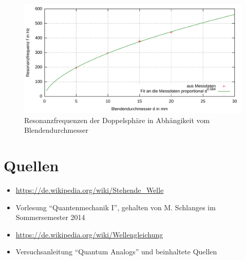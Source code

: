 \documentclass[numbers=noenddot,12pt,a4paper]{scrartcl}
\begin{document}
\begin{figure}[H]
	\centering
	\includegraphics[width=\textwidth]{messwerte/resonanzendoppelsphre.pdf}
	\caption{Resonanzfrequenzen der Doppelsphäre in Abhängikeit vom Blendendurchmesser}\label{img:reskopp}
\end{figure}
\vspace{-2em}
\section{Quellen}
\begin{itemize}
	\item \url{https://de.wikipedia.org/wiki/Stehende_Welle}
	\item Vorlesung "`Quantenmechanik I"', gehalten von M. Schlanges im Sommersemester 2014
	\item \url{https://de.wikipedia.org/wiki/Wellengleichung}
	\item Versuchsanleitung "`Quantum Analogs"' und beinhaltete Quellen
\end{itemize}
\end{document}
